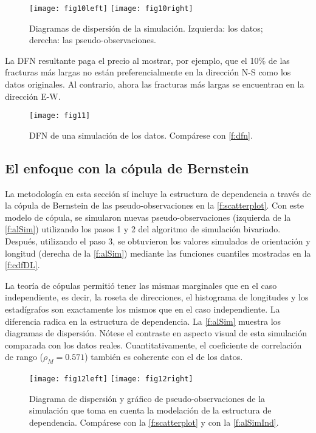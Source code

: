 \begin{figure}[H]
	\centering
	\texttt{[image: fig10left]}
	\qquad
	\texttt{[image: fig10right]}
	\caption{Diagramas de dispersi\'on de la simulaci\'on. Izquierda: los datos; derecha: las pseudo-observaciones.}
	\label{f:alSimInd}
\end{figure}

La DFN resultante paga el precio al mostrar, por ejemplo, que el 10\% de las fracturas m\'as largas no est\'an preferencialmente en la direcci\'on N-S como los datos originales. Al contrario, ahora las fracturas m\'as largas se encuentran en la direcci\'on E-W.

\begin{figure}[H]
	\centering
	\texttt{[image: fig11]}
	\caption{DFN de una simulaci\'on de los datos. Comp\'arese con \autoref{f:dfn}.}
	\label{f:DFN_simInd}
\end{figure}

\subsection{El enfoque con la c\'opula de Bernstein}

La metodolog\'ia en esta secci\'on s\'i incluye la estructura de dependencia a trav\'es de la c\'opula de Bernstein de las pseudo-observaciones en la \autoref{f:scatterplot}. Con este modelo de c\'opula, se simularon nuevas pseudo-observaciones (izquierda de  la \autoref{f:alSim}) utilizando los pasos 1 y 2 del algoritmo de simulaci\'on bivariado. Despu\'es, utilizando el paso 3, se obtuvieron los valores simulados de orientaci\'on y longitud (derecha de la \autoref{f:alSim}) mediante las funciones cuantiles mostradas en la \autoref{f:cdfDL}.

La teor\'ia de c\'opulas permiti\'o tener las mismas marginales que en el caso independiente, es decir, la roseta de direcciones, el histograma de longitudes y los estad\'igrafos son exactamente los mismos que en el caso independiente. La diferencia radica en la estructura de dependencia. La \autoref{f:alSim} muestra los diagramas de dispersi\'on. N\'otese el contraste en aspecto visual de esta simulaci\'on comparada con los datos reales. Cuantitativamente, el coeficiente de correlaci\'on de rango ($\rho_M = 0.571$) tambi\'en es coherente con el de los datos.

\begin{figure}[H]
	\centering
	\texttt{[image: fig12left]}
	\qquad
	\texttt{[image: fig12right]}
	\caption{Diagrama de dispersi\'on y gr\'afico de pseudo-observaciones de la simulaci\'on que toma en cuenta la modelaci\'on de la estructura de dependencia. Comp\'arese con la \autoref{f:scatterplot} y con la \autoref{f:alSimInd}.}
	\label{f:alSim}
\end{figure}

